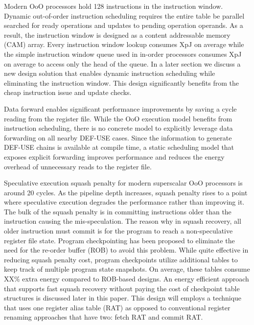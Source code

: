Modern OoO processors hold 128 instructions in the instruction window. Dynamic
out-of-order instruction scheduling requires the entire table be parallel
searched for ready operations and updates to pending operation operands. As a
result, the instruction window is designed as a content addressable memory (CAM)
    array. Every instruction window lookup consumes XpJ on average while the
    simple instruction window queue used in in-order processors consumes XpJ on
    average to access only the head of the queue. In a later section we discuss
    a new design solution that enables dynamic instruction scheduling while
    eliminating the instruction window. This design significantly benefits from
    the cheap instruction issue and update checks.

Data forward enables significant performance improvements by saving a cycle
reading from the register file. While the OoO execution model benefits from
instruction scheduling, there is no concrete model to explicitly leverage data
forwarding on all nearby DEF-USE cases. Since the information to generate
DEF-USE chains is available at compile time, a static scheduling model that
exposes explicit forwarding improves performance and reduces the energy overhead
of unnecessary reads to the register file.

Speculative execution squash penalty for modern superscalar OoO processors is
around 20 cycles. As the pipeline depth increases, squash penalty rises to a
point where speculative execution degrades the performance rather than improving
it. The bulk of the squash penalty is in committing instructions older than the
instruction causing the mis-speculation.  The reason why in squash recovery, all
older instruction must commit is for the program to reach a non-speculative
register file state.  Program checkpointing has been proposed to eliminate the
need for the re-order buffer (ROB) to avoid this problem.  While quite effective
in reducing squash penalty cost, program checkpoints utilize additional tables
to keep track of multiple program state snapshots.  On average, these tables
consume XX\% extra energy compared to ROB-based designs.  An energy efficient
approach that supports fast squash recovery without paying the cost of
checkpoint table structures is discussed later in this paper. This design will
employs a technique that uses one register alias table (RAT) as opposed to
conventional register renaming approaches that have two: fetch RAT and commit
RAT.

